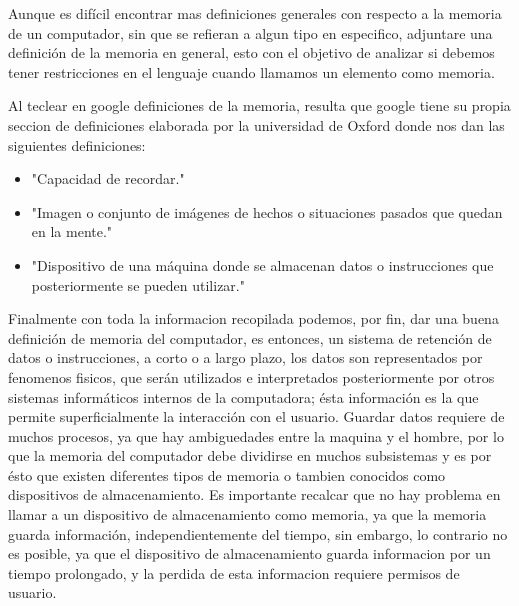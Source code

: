 \documentclass{article}
\begin{document}
Aunque es difícil encontrar mas definiciones generales con respecto a la memoria de un computador, sin que se refieran a algun tipo en especifico, adjuntare una definición de la memoria en general, esto con el objetivo de analizar si debemos tener restricciones en el lenguaje cuando llamamos un elemento como memoria.

Al teclear en google definiciones de la memoria, resulta que google tiene su propia seccion de definiciones elaborada por la universidad de Oxford donde nos dan las siguientes definiciones:
\begin{itemize}
    \item
    "Capacidad de recordar."\cite{google}
    \item
    "Imagen o conjunto de imágenes de hechos o situaciones pasados que quedan en la mente."\cite{google}
    \item
    "Dispositivo de una máquina donde se almacenan datos o instrucciones que posteriormente se pueden utilizar."\cite{google}
\end{itemize}

Finalmente con toda la informacion recopilada podemos, por fin, dar una buena definición de memoria del computador, es entonces, un sistema de  retención de datos o instrucciones, a corto o a largo plazo, los datos son representados por fenomenos fisicos, que serán utilizados e interpretados posteriormente por otros sistemas informáticos internos de la computadora; ésta información es la que permite superficialmente la interacción con el usuario. Guardar datos requiere de muchos procesos, ya que hay ambiguedades entre la maquina y el hombre, por lo que la memoria del computador debe dividirse en muchos subsistemas y es por ésto que existen diferentes tipos de memoria o tambien conocidos como dispositivos de almacenamiento.
Es importante recalcar que no hay problema en llamar a un dispositivo de almacenamiento como memoria, ya que la memoria guarda información, independientemente del tiempo, sin embargo, lo contrario no es posible, ya que el dispositivo de almacenamiento guarda informacion por un tiempo prolongado, y la perdida de esta informacion requiere permisos de usuario.
\end{document}
